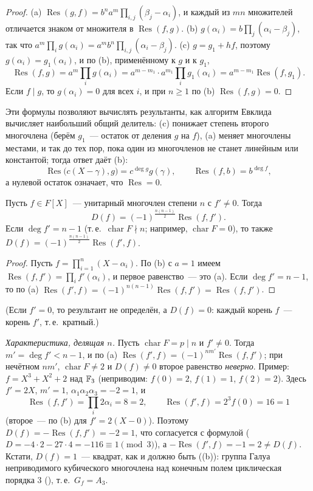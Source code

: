 \begin{proof}
(a) $\operatorname{Res}(g,f)=b^na^m\prod_{i,j}(\beta_j-\alpha_i)$, и каждый из $mn$ множителей отличается знаком от
множителя в $\operatorname{Res}(f,g)$.
(b) $g(\alpha_i)=b\prod_j(\alpha_i-\beta_j)$, так что $a^m\prod_ig(\alpha_i)=a^mb^n\prod_{i,j}(\alpha_i-\beta_j)$.
(c) $g=g_1+hf$, поэтому $g(\alpha_i)=g_1(\alpha_i)$, и по (b), применённому к $g$ и к $g_1$,
\[
\operatorname{Res}(f,g)=a^m\prod_ig(\alpha_i)=a^{m-m_1}\cdot a^{m_1}\prod_ig_1(\alpha_i)=a^{m-m_1}\operatorname{Res}(f,g_1).
\]
Если $f\mid g$, то $g(\alpha_i)=0$ для всех $i$, и при $n\ge1$ по (b) $\operatorname{Res}(f,g)=0$.
\end{proof}

Эти формулы позволяют вычислять результанты, как алгоритм Евклида вычисляет наибольший общий делитель: (c) понижает
степень второго многочлена (берём $g_1$~--- остаток от деления $g$ на $f$), (a) меняет многочлены местами, и так до
тех пор, пока один из многочленов не станет линейным или константой; тогда ответ даёт (b):
\[
\operatorname{Res}\bigl(c(X-\gamma),g\bigr)=c^{\deg g}g(\gamma),\qquad \operatorname{Res}(f,b)=b^{\deg f},
\]
а нулевой остаток означает, что $\operatorname{Res}=0$.

\begin{proposition}[4.36]
Пусть $f\in F[X]$~--- унитарный многочлен степени $n$ с $f'\ne0$. Тогда
\[
D(f)=(-1)^{\frac{n(n-1)}2}\operatorname{Res}(f,f').
\]
Если $\deg f'=n-1$ \textup(т.\,е.\ $\operatorname{char}F\nmid n$; например, $\operatorname{char}F=0$\textup), то также
$D(f)=(-1)^{\frac{n(n-1)}2}\operatorname{Res}(f',f)$.
\end{proposition}

\begin{proof}
Пусть $f=\prod_{i=1}^n(X-\alpha_i)$. По (b) с $a=1$ имеем $\operatorname{Res}(f,f')=\prod_if'(\alpha_i)$, и первое
равенство~--- это (a). Если $\deg f'=n-1$, то по (a)
$\operatorname{Res}(f',f)=(-1)^{n(n-1)}\operatorname{Res}(f,f')=\operatorname{Res}(f,f')$.
\end{proof}

(Если $f'=0$, то результант не определён, а $D(f)=0$: каждый корень $f$~--- корень $f'$, т.\,е.\ кратный.)

\emph{Характеристика, делящая $n$.} Пусть $\operatorname{char}F=p\mid n$ и $f'\ne0$. Тогда $m'=\deg f'<n-1$, и по (a)
$\operatorname{Res}(f',f)=(-1)^{nm'}\operatorname{Res}(f,f')$; при нечётном $nm'$, $\operatorname{char}F\ne2$ и $D(f)\ne0$
второе равенство  \emph{неверно}. Пример: $f=X^3+X^2+2$ над $\mathbb F_3$ (неприводим: $f(0)=2$, $f(1)=1$, $f(2)=2$). Здесь
$f'=2X$, $m'=1$, $\alpha_1\alpha_2\alpha_3=-2=1$, и
\[
\operatorname{Res}(f,f')=\prod_i2\alpha_i=8=2,\qquad \operatorname{Res}(f',f)=2^3f(0)=16=1
\]
(второе~--- по (b) для $f'=2(X-0)$). Поэтому $D(f)=-\operatorname{Res}(f,f')=-2=1$, что согласуется с формулой 
($D=-4\cdot2-27\cdot4=-116\equiv1\pmod3$), а $-\operatorname{Res}(f',f)=-1=2\ne D(f)$. Кстати, $D(f)=1$~--- квадрат, как и
должно быть ((b)): группа Галуа неприводимого кубического многочлена над конечным полем циклическая порядка $3$
(), т.\,е.\ $G_f=A_3$.

